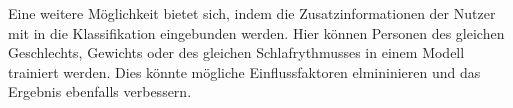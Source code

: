 Eine weitere Möglichkeit bietet sich, indem die Zusatzinformationen der Nutzer mit in die Klassifikation eingebunden werden.
Hier können Personen des gleichen Geschlechts, Gewichts oder des gleichen Schlafrythmusses in einem Modell trainiert werden.
Dies könnte mögliche Einflussfaktoren elmininieren und das Ergebnis ebenfalls verbessern.

 \cite{perslevUTimeFullyConvolutional2019}

